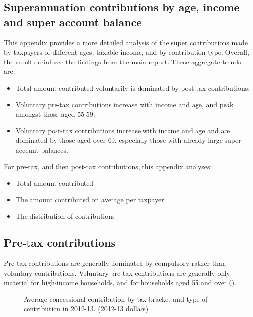 \begin{subappendices}




\chapter{Superannuation contributions by age, income and super account balance}\label{appendix:SUPER-A}
This appendix provides a more detailed analysis of the super contributions made by taxpayers of different ages, taxable income, and by contribution type. Overall, the results reinforce the findings from the main report. These aggregate trends are:
\begin{itemize}
\item Total amount contributed voluntarily is dominated by post-tax contributions; 
\item Voluntary pre-tax contributions increase with income and age, and peak amongst those aged 55-59;
\item Voluntary post-tax contributions increase with income and age and are dominated by those aged over 60, especially those with already large super account balances.
\end{itemize}
For pre-tax, and then post-tax contributions, this appendix analyses:
\begin{itemize}
\item Total amount contributed
\item The amount contributed on average per taxpayer
\item The distribution of contributions
\end{itemize}
\section{Pre-tax contributions}
Pre-tax contributions are generally dominated by compulsory rather than voluntary contributions. Voluntary pre-tax contributions are generally only material for high-income households, and for households aged 55 and over ().


\begin{figure}
%
{Average concessional contribution by tax bracket and type of contribution in 2012-13. (2012-13 dollars)}\label{fig:SUPER-A-1}


\end{figure}
\end{subappendices}
